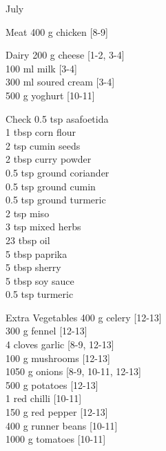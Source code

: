 \begin{menu}{July}
      \begin{shoppinglist}{Meat}
      400 g chicken {\scriptsize[8-9]}\\
      \end{shoppinglist}%
      \begin{shoppinglist}{Dairy}
      200 g cheese {\scriptsize[1-2, 3-4]}\\
      100 ml milk {\scriptsize[3-4]}\\
      300 ml soured cream {\scriptsize[3-4]}\\
      500 g yoghurt {\scriptsize[10-11]}\\
      \end{shoppinglist}%
      \par\vfil %
      \vfil\clearpage %
      \begin{shoppinglist}{Check}
      0.5 tsp asafoetida \\
      1 tbsp corn flour \\
      2 tsp cumin seeds \\
      2 tbsp curry powder \\
      0.5 tsp ground coriander \\
      0.5 tsp ground cumin \\
      0.5 tsp ground turmeric \\
      2 tsp miso \\
      3 tsp mixed herbs \\
      23 tbsp oil \\
      5 tbsp paprika \\
      5 tbsp sherry \\
      5 tbsp soy sauce \\
      0.5 tsp turmeric \\
      \end{shoppinglist}%
      \begin{shoppinglist}{Extra Vegetables}
      400 g celery {\scriptsize[12-13]}\\
      300 g fennel {\scriptsize[12-13]}\\
      4 cloves garlic {\scriptsize[8-9, 12-13]}\\
      100 g mushrooms {\scriptsize[12-13]}\\
      1050 g onions {\scriptsize[8-9, 10-11, 12-13]}\\
      500 g potatoes {\scriptsize[12-13]}\\
      1  red chilli {\scriptsize[10-11]}\\
      150 g red pepper {\scriptsize[12-13]}\\
      400 g runner beans {\scriptsize[10-11]}\\
      1000 g tomatoes {\scriptsize[10-11]}\\
      \end{shoppinglist}%
      \par\vfil %
    \vfil\clearpage
  

\end{menu}
